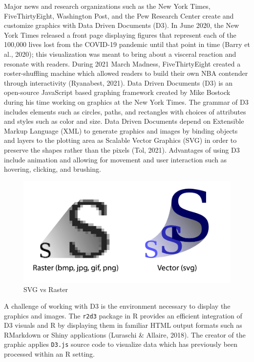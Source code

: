 \documentclass[print]{nuthesis}
\begin{document}
Major news and research organizations such as the New York Times, FiveThirtyEight, Washington Post, and the Pew Research Center create and customize graphics with Data Driven Documents (D3).
In June 2020, the New York Times released a front page displaying figures that represent each of the 100,000 lives lost from the COVID-19 pandemic until that point in time (Barry et al., 2020); this visualization was meant to bring about a visceral reaction and resonate with readers.
During 2021 March Madness, FiveThirtyEight created a roster-shuffling machine which allowed readers to build their own NBA contender through interactivity (Ryanabest, 2021).
Data Driven Documents (D3) is an open-source JavaScript based graphing framework created by Mike Bostock during his time working on graphics at the New York Times.
The grammar of D3 includes elements such as circles, paths, and rectangles with choices of attributes and styles such as color and size.
Data Driven Documents depend on Extensible Markup Language (XML) to generate graphics and images by binding objects and layers to the plotting area as Scalable Vector Graphics (SVG) in order to preserve the shapes rather than the pixels  (Tol, 2021).
Advantages of using D3 include animation and allowing for movement and user interaction such as hovering, clicking, and brushing.

\begin{figure}[tbp]

{\centering \includegraphics[width=0.7\linewidth,]{images/02-you-draw-it/raster-vs-vector} 

}

\caption{SVG vs Raster}\label{fig:raster-vs-vector}
\end{figure}

A challenge of working with D3 is the environment necessary to display the graphics and images.
The \texttt{r2d3} package in R provides an efficient integration of D3 visuals and R by displaying them in familiar HTML output formats such as RMarkdown or Shiny applications (Luraschi \& Allaire, 2018).
The creator of the graphic applies \texttt{D3.js} source code to visualize data which has previously been processed within an R setting.
\end{document}
